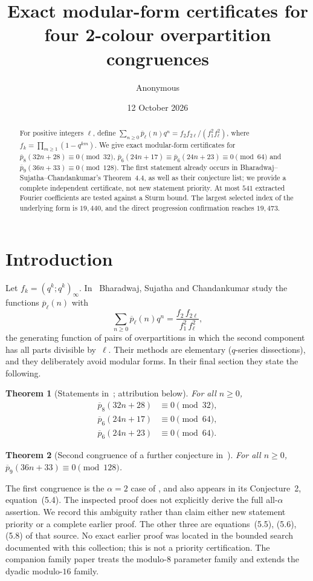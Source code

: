 \documentclass[11pt]{article}
\title{Exact modular-form certificates for four 2-colour overpartition congruences}
\author{Anonymous}\date{12 October 2026}
\newtheorem{theorem}{Theorem}\newtheorem{lemma}[theorem]{Lemma}\newtheorem{proposition}[theorem]{Proposition}
\theoremstyle{remark}\newtheorem{remark}[theorem]{Remark}
\newcommand{\pb}{\overline{p}}
\begin{document}
\maketitle
\begin{abstract}
For positive integers $\ell$, define $\sum_{n\ge0}\pb_\ell(n)q^n=f_2f_{2\ell}/(f_1^2f_\ell^2)$, where $f_k=\prod_{m\ge1}(1-q^{km})$. We give exact modular-form certificates for $\pb_8(32n+28)\equiv0\pmod{32}$, $\pb_6(24n+17)\equiv\pb_6(24n+23)\equiv0\pmod{64}$ and $\pb_9(36n+33)\equiv0\pmod{128}$. The first statement already occurs in Bharadwaj--Sujatha--Chandankumar's Theorem~4.4, as well as their conjecture list; we provide a complete independent certificate, not new statement priority. At most $541$ extracted Fourier coefficients are tested against a Sturm bound. The largest selected index of the underlying form is $19{,}440$, and the direct progression confirmation reaches $19{,}473$.
\end{abstract}

\section{Introduction}
Let $f_k=(q^k;q^k)_\infty$. In~\cite{BSC} Bharadwaj, Sujatha and Chandankumar study the functions $\pb_\ell(n)$ with
\[\sum_{n\ge0}\pb_\ell(n)q^n=\frac{f_2\,f_{2\ell}}{f_1^2\,f_\ell^2},\]
the generating function of pairs of overpartitions in which the second component has all parts divisible by~$\ell$. Their methods are elementary ($q$-series dissections), and they deliberately avoid modular forms. In their final section they state the following.

\begin{theorem}[Statements in~\cite{BSC}; attribution below]\label{thm:main}
For all $n\ge0$,
\begin{align*}
\pb_{8}(32n+28)&\equiv0\pmod{32},\\
\pb_{6}(24n+17)&\equiv0\pmod{64},\\
\pb_{6}(24n+23)&\equiv0\pmod{64}.
\end{align*}
\end{theorem}

\begin{theorem}[Second congruence of a further conjecture in~\cite{BSC}]\label{thm:nine}
For all $n\ge0$, $\pb_{9}(36n+33)\equiv0\pmod{128}$.
\end{theorem}

The first congruence is the $\alpha=2$ case of \cite[Theorem~4.4, equation~(4.51)]{BSC}, and also appears in its Conjecture~2, equation~(5.4). The inspected proof does not explicitly derive the full all-$\alpha$ assertion. We record this ambiguity rather than claim either new statement priority or a complete earlier proof. The other three are equations~(5.5), (5.6), (5.8) of that source. No exact earlier proof was located in the bounded search documented with this collection; this is not a priority certification. The companion family paper treats the modulo-$8$ parameter family and extends the dyadic modulo-$16$ family.
\end{document}
